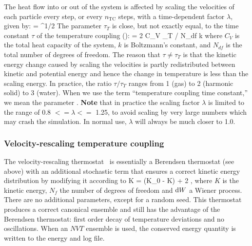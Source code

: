The heat flow into or out of the system is affected by scaling the
velocities of each particle every step, or every $n_\mathrm{TC}$ steps,
with a time-dependent factor $\lambda$, given by:
\beq 
\lambda = ^{1/2}
\label{eqn:lambda}
\eeq
The parameter $\tau_T$ is close, but not exactly equal, to the time constant
$\tau$ of the temperature coupling ():
\beq
\tau = 2 C_V \tau_T / N_{df} k
\eeq
where $C_V$ is the total heat capacity of the system, $k$ is Boltzmann's
constant, and $N_{df}$ is the total number of degrees of freedom. The
reason that $\tau \neq \tau_T$ is that the kinetic energy change
caused by scaling the velocities is partly redistributed between
kinetic and potential energy and hence the change in temperature is
less than the scaling energy.  In practice, the ratio $\tau / \tau_T$
ranges from 1 (gas) to 2 (harmonic solid) to 3 (water). When we use
the term ``temperature coupling time constant,'' we mean the parameter
.  
{\bf Note} that in practice the scaling factor $\lambda$ is limited to 
the range of 0.8 $<= \lambda <=$ 1.25, to avoid scaling by very large
numbers which may crash the simulation. In normal use, 
$\lambda$ will always be much closer to 1.0.

\subsubsection{Velocity-rescaling temperature coupling}
The velocity-rescaling thermostat~\cite{Bussi2007a} is essentially a Berendsen
thermostat (see above) with an additional stochastic term that ensures
a correct kinetic energy distribution by modifying it according to
\beq
\de K = (K_0 - K)  + 2  ,
\label{eqn:vrescale}
\eeq
where $K$ is the kinetic energy, $N_f$ the number of degrees of freedom and $\de W$ a Wiener process.
There are no additional parameters, except for a random seed.
This thermostat produces a correct canonical ensemble and still has
the advantage of the Berendsen thermostat: first order decay of
temperature deviations and no oscillations.
When an $NVT$ ensemble is used, the conserved energy quantity
is written to the energy and log file.  

